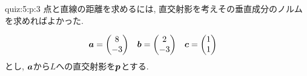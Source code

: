 \begin{answerof}{quiz:5:p:3}
  点と直線の距離を求めるには,
  直交射影を考えその垂直成分のノルムを求めればよかった.


  \begin{align*}
    \boldsymbol{a}&=\begin{pmatrix}8\\-3\end{pmatrix}&
    \boldsymbol{b}&=\begin{pmatrix}2\\-3\end{pmatrix}&
    \boldsymbol{c}&=\begin{pmatrix}1\\1\end{pmatrix}
  \end{align*}
  とし, $\boldsymbol{a}$から$L$への直交射影を$\boldsymbol{p}$とする.
  

\end{answerof}
